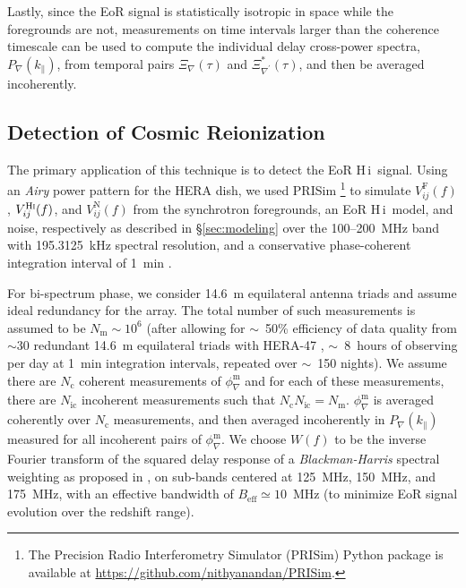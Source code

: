 \documentclass[
reprint,
superscriptaddress,
amsmath,
amssymb,
aps,
prd
]{revtex4-1}
\newcommand{\HI}{H\,{\sc i}}
\begin{document}
Lastly, since the EoR signal is statistically isotropic in space while the foregrounds are not, measurements on time intervals larger than the coherence timescale can be used to compute the individual delay cross-power spectra, $P_\nabla(k_\parallel)$, from temporal pairs $\Xi_\nabla(\tau)$ and $\Xi_{\nabla^\prime}^*(\tau)$, and then be averaged incoherently. 

\subsection{Detection of Cosmic Reionization}\label{sec:EoR-detection}

The primary application of this technique is to detect the EoR \HI\ signal. Using an {\it Airy} power pattern for the HERA dish, we used PRISim \footnote{The Precision Radio Interferometry Simulator (PRISim) Python package is available at \href{https://github.com/nithyanandan/PRISim}{https://github.com/nithyanandan/PRISim}.} to simulate $V_{ij}^\textrm{F}(f)$, $V_{ij}^\textrm{H{\sc i}}(f)$, and $V_{ij}^\textrm{N}(f)$ from the synchrotron foregrounds, an EoR \HI\ model, and noise, respectively as described in \S\ref{sec:modeling} over the 100--200~MHz band with 195.3125~kHz spectral resolution, and a conservative phase-coherent integration interval of 1~min \cite{car18}. 

For bi-spectrum phase, we consider 14.6~m equilateral antenna triads and assume ideal redundancy for the array. The total number of such measurements is assumed to be $N_\textrm{m} \sim 10^6$ (after allowing for $\sim$~50\% efficiency of data quality from $\sim 30$ redundant 14.6~m equilateral triads with HERA-47 \cite[see layout in][]{car18}, $\sim$~8~hours of observing per day at 1~min integration intervals, repeated over $\sim$~150 nights). We assume there are $N_\textrm{c}$ coherent measurements of $\phi_\nabla^\textrm{m}$ and for each of these measurements, there are $N_\textrm{ic}$ incoherent measurements such that $N_\textrm{c}N_\textrm{ic}=N_\textrm{m}$. $\phi_\nabla^\textrm{m}$ is averaged coherently over $N_\textrm{c}$ measurements, and then averaged incoherently in $P_\nabla(k_\parallel)$ measured for all incoherent pairs of $\phi_\nabla^\textrm{m}$. We choose $W(f)$ to be the inverse Fourier transform of the squared delay response of a {\it Blackman-Harris} spectral weighting \cite{har78} as proposed in \cite{thy16}, on sub-bands centered at 125~MHz, 150~MHz, and 175~MHz, with an effective bandwidth of $B_\textrm{eff}\simeq 10$~MHz (to minimize EoR signal evolution over the redshift range).
\end{document}
